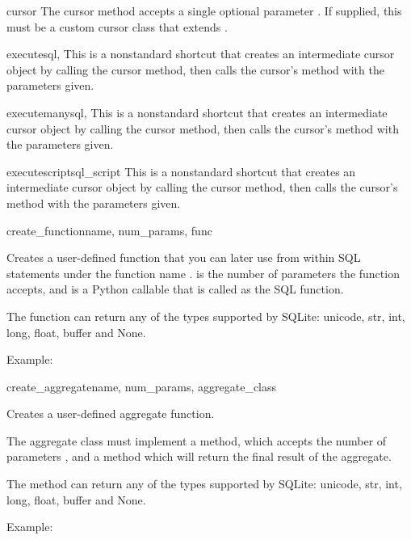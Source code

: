 \begin{methoddesc}{cursor}{}
  The cursor method accepts a single optional parameter .
  If supplied, this must be a custom cursor class that extends 
  .
\end{methoddesc}

\begin{methoddesc}{execute}{sql, }
This is a nonstandard shortcut that creates an intermediate cursor object by
calling the cursor method, then calls the cursor's  method with the
parameters given.
\end{methoddesc}

\begin{methoddesc}{executemany}{sql, }
This is a nonstandard shortcut that creates an intermediate cursor object by
calling the cursor method, then calls the cursor's  method with the
parameters given.
\end{methoddesc}

\begin{methoddesc}{executescript}{sql_script}
This is a nonstandard shortcut that creates an intermediate cursor object by
calling the cursor method, then calls the cursor's  method with the
parameters given.
\end{methoddesc}

\begin{methoddesc}{create_function}{name, num_params, func}

Creates a user-defined function that you can later use from within SQL
statements under the function name .  is the number
of parameters the function accepts, and  is a Python callable that is
called as the SQL function.

The function can return any of the types supported by SQLite: unicode, str,
int, long, float, buffer and None.

Example:

  
\end{methoddesc}

\begin{methoddesc}{create_aggregate}{name, num_params, aggregate_class}

Creates a user-defined aggregate function.

The aggregate class must implement a  method, which accepts the
number of parameters , and a  method which
will return the final result of the aggregate.

The  method can return any of the types supported by SQLite:
unicode, str, int, long, float, buffer and None.

Example:

  
\end{methoddesc}

